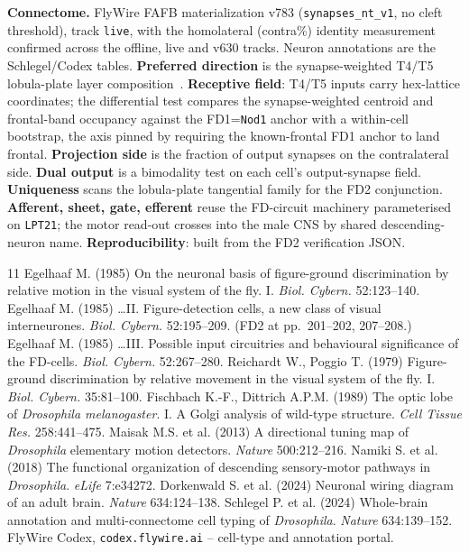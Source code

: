 \documentclass[11pt]{article}
\newcommand{\ttt}[1]{\texttt{#1}}
\begin{document}
\textbf{Connectome.} FlyWire FAFB materialization v783 (\ttt{synapses\_nt\_v1}, no cleft threshold), track \ttt{live}, with the homolateral (contra\%) identity measurement confirmed across the offline, live and v630 tracks. Neuron annotations are the Schlegel/Codex tables. \textbf{Preferred direction} is the synapse-weighted T4/T5 lobula-plate layer composition~\cite{fd1989,maisak2013}. \textbf{Receptive field}: T4/T5 inputs carry hex-lattice coordinates; the differential test compares the synapse-weighted centroid and frontal-band occupancy against the FD1=\ttt{Nod1} anchor with a within-cell bootstrap, the axis pinned by requiring the known-frontal FD1 anchor to land frontal. \textbf{Projection side} is the fraction of output synapses on the contralateral side. \textbf{Dual output} is a bimodality test on each cell's output-synapse field. \textbf{Uniqueness} scans the lobula-plate tangential family for the FD2 conjunction. \textbf{Afferent, sheet, gate, efferent} reuse the FD-circuit machinery parameterised on \ttt{LPT21}; the motor read-out crosses into the male CNS by shared descending-neuron name. \textbf{Reproducibility}: built from the FD2 verification JSON.

\clearpage

\begin{thebibliography}{11}
 Egelhaaf M. (1985) On the neuronal basis of figure-ground discrimination by relative motion in the visual system of the fly. I. \textit{Biol. Cybern.} 52:123--140.
 Egelhaaf M. (1985) \ldots II. Figure-detection cells, a new class of visual interneurones. \textit{Biol. Cybern.} 52:195--209. (FD2 at pp.~201--202, 207--208.)
 Egelhaaf M. (1985) \ldots III. Possible input circuitries and behavioural significance of the FD-cells. \textit{Biol. Cybern.} 52:267--280.
 Reichardt W., Poggio T. (1979) Figure-ground discrimination by relative movement in the visual system of the fly. I. \textit{Biol. Cybern.} 35:81--100.
 Fischbach K.-F., Dittrich A.P.M. (1989) The optic lobe of \textit{Drosophila melanogaster}. I. A Golgi analysis of wild-type structure. \textit{Cell Tissue Res.} 258:441--475.
 Maisak M.S. et al. (2013) A directional tuning map of \textit{Drosophila} elementary motion detectors. \textit{Nature} 500:212--216.
 Namiki S. et al. (2018) The functional organization of descending sensory-motor pathways in \textit{Drosophila}. \textit{eLife} 7:e34272.
 Dorkenwald S. et al. (2024) Neuronal wiring diagram of an adult brain. \textit{Nature} 634:124--138.
 Schlegel P. et al. (2024) Whole-brain annotation and multi-connectome cell typing of \textit{Drosophila}. \textit{Nature} 634:139--152.
 FlyWire Codex, \texttt{codex.flywire.ai} -- cell-type and annotation portal.
\end{thebibliography}
\end{document}
